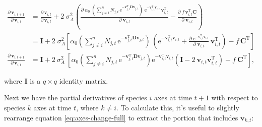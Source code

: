 \begin{equation*}
\begin{split}
    \frac{ \partial \, \mathbf{v}_{i,t+1} }{ \partial \, \mathbf{v}_{i,t} } &=
        \frac{ \partial \, \mathbf{v}_{i,t} }{ \partial \, \mathbf{v}_{i,t} } +
        2 \; \sigma_A^2
        \left(
            \frac{ \partial \;
                \alpha_0 \; 
                \left( 
                    \sum_{j \ne i}^{n}{ N_{j,t} \, \textrm{e}^{
                    - \mathbf{v}_{j,t}^{\textrm{T}}
                    \mathbf{D} \mathbf{v}_{j,t} } }
                \right) \;
                    \textrm{e}^{-\mathbf{v}_{i,t}^{\textrm{T}} \mathbf{v}_{i,t}} \,
                    \mathbf{v}_{i,t}^{\textrm{T}}}{\partial \; \mathbf{v}_{i,t} } -
            \frac{ \partial \; f \, \mathbf{v}_{i,t}^{\textrm{T}} \mathbf{C}}{\partial \; \mathbf{v}_{i,t} }
        \right) \\
    &=
        \mathbf{I} +
        2 \; \sigma_A^2
        \left[
            \alpha_0
            \left( 
                \sum_{j \ne i}^{n}{ N_{j,t} \, \textrm{e}^{
                - \mathbf{v}_{j,t}^{\textrm{T}}
                \mathbf{D} \mathbf{v}_{j,t} } }
            \right) \,
            \left(
                \textrm{e}^{-\mathbf{v}_{i,t}^{\textrm{T}} \mathbf{v}_{i,t}} +
                \frac{ \partial \;
                        \textrm{e}^{-\mathbf{v}_{i,t}^{\textrm{T}} \mathbf{v}_{i,t}}
                        }{\partial \; \mathbf{v}_{i,t} } \, \mathbf{v}_{i,t}^{\textrm{T}}
            \right) -
            f \, \mathbf{C}^{\textrm{T}}
            \right] \\[2ex]
    \frac{ \partial \, \mathbf{v}_{i,t+1} }{ \partial \, \mathbf{v}_{i,t} } &= \mathbf{I} + 2 ~ \sigma_A^2 ~
        \left[
            \alpha_0 
            \left( 
                \sum_{j \ne i}^{n}{ N_{j,t} \, \textrm{e}^{
                - \mathbf{v}_{j,t}^{\textrm{T}}
                \mathbf{D} \mathbf{v}_{j,t} } }
            \right)
            \textrm{e}^{ - \mathbf{v}_{i,t}^{\textrm{T}} \mathbf{v}_{i,t} }
            \left(
                \mathbf{I} - 2 ~ \mathbf{v}_{i,t} \mathbf{v}_{i,t}^{\textrm{T}}
            \right) -
            f \: \mathbf{C}^{\textrm{T}}
        \right]
    \textrm{,}
\end{split}
\end{equation*}

\noindent where $\mathbf{I}$ is a $q \times q$ identity matrix.


Next we have the partial derivatives of species $i$ axes at time $t+1$ with respect to 
species $k$ axes at time $t$, where $k \ne i$.
To calculate this, it's useful to slightly rearrange equation \ref{eq:axes-change-full} to
extract the portion that includes $\mathbf{v}_{k,t}$:


